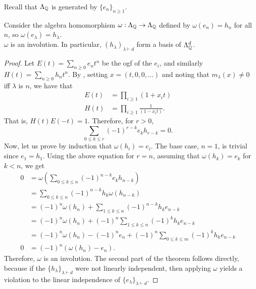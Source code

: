 	Recall that $\Lambda_{\mathbb{Q}}$ is generated by $\{e_n\}_{n \ge 1}$.

	\begin{ftheo}
		\label{theo: h basis}
		Consider the algebra homomorphism $\omega : \Lambda_{\mathbb{Q}} \to \Lambda_{\mathbb{Q}}$ defined by $\omega(e_n) = h_n$ for all $n$, so $\omega(e_\lambda) = h_\lambda$.\\
		$\omega$ is an involution. In particular, $(h_\lambda)_{\lambda \vdash d}$ form a basis of $\Lambda_{\mathbb{Q}}^d$.
	\end{ftheo}
	\begin{proof}
		Let $E(t) = \sum_{n \ge 0} e_n t^n$ be the ogf of the $e_i$, and similarly $H(t) = \sum_{n \ge 0} h_n t^n$. By , setting $x = (t,0,0,\ldots)$ and noting that $m_\lambda(x) \ne 0$ iff $\lambda$ is $n$, we have that
		\begin{align*}
			E(t) &= \prod_{i \ge 1} (1+x_it) \\
			H(t) &= \prod_{i \ge 1} \frac{1}{(1-x_it)}.
		\end{align*}
		That is, $H(t) E(-t) = 1$. Therefore, for $r > 0$,
		\[ \sum_{0 \le k \le r} (-1)^{r-k} e_k h_{r-k} = 0. \]
		Now, let us prove by induction that $\omega(h_i) = e_i$. The base case, $n = 1$, is trivial since $e_1 = h_1$. Using the above equation for $r = n$, assuming that $\omega(h_k) = e_k$ for $k < n$, we get
		\begin{align*}
			0 &= \omega\left(\sum_{0 \le k \le n} (-1)^{n-k} e_k h_{n-k}\right) \\
				&= \sum_{0 \le k \le n} (-1)^{n-k} h_k \omega(h_{n-k}) \\
				&= (-1)^{n}\omega(h_n) + \sum_{1 \le k \le n} (-1)^{n-k} h_k e_{n-k} \\
				&= (-1)^{n}\omega(h_n) + (-1)^n \sum_{1 \le k \le n} (-1)^{k} h_k e_{n-k} \\
				&= (-1)^n \omega(h_n) - (-1)^n e_n + (-1)^n \sum_{0 \le k \le m} (-1)^k h_k e_{n-k} \\
			0 &= (-1)^n (\omega(h_n) - e_n).
		\end{align*}
		Therefore, $\omega$ is an involution. The second part of the theorem follows directly, because if the $\{h_\lambda\}_{\lambda \vdash d}$ were not linearly independent, then applying $\omega$ yields a violation to the linear independence of $\{e_\lambda\}_{\lambda \vdash d}$.
	\end{proof}

